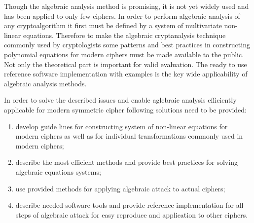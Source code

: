Though the algebraic analysis method is promising, it is not yet widely used and
has been applied to only few ciphers. In order to perform algebraic analysis of
any cryptoalgorithm it first must be defined by a system of multivariate
non-linear equations. Therefore to make the algebraic cryptanalysis technique
commonly used by cryptologists some patterns and best practices in constructing
polynomial equations for modern ciphers must be made available to the public.
Not only the theoretical part is important for valid evaluation. The ready to
use reference software implementation with examples is the key wide
applicability of algebraic analysis methods.

In order to solve the described issues and enable aglebraic analysis efficiently
applicable for modern symmetric cipher following solutions need to be provided:

\begin{enumerate}
    \item develop guide lines for constructing system of non-linear equations for
modern ciphers as well as for individual transformations commonly used in modern
ciphers;
    \item describe the most efficient methods and provide best practices for
        solving algebraic equations systems;
    \item use provided methods for applying algebraic attack to actual ciphers;
    \item describe needed software tools and provide reference implementation
        for all steps of algebraic attack for easy reproduce and application to
        other ciphers.
\end{enumerate}



